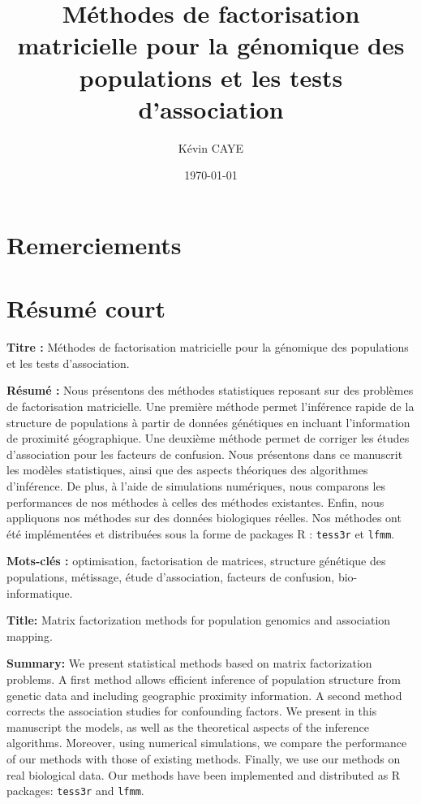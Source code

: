 \documentclass[12pt,a4paper,twoside]{ugathesis}
\author{Kévin CAYE}
\date{\today}
\title{Méthodes de factorisation matricielle pour la génomique des populations et les tests d'association}
\begin{document}
\maketitle
\tableofcontents

\baselineskip 0.7cm
\frontmatter

\chapter{Remerciements}
\label{sec:org8effc96}
\chapter{Résumé court}
\label{sec:org71b884f}

\noindent \textbf{Titre :} Méthodes de factorisation matricielle pour la génomique des
populations et les tests d'association.

\noindent \textbf{Résumé :} Nous présentons des méthodes statistiques reposant sur des
problèmes de factorisation matricielle. Une première méthode permet l'inférence
rapide de la structure de populations à partir de données génétiques en incluant
l'information de proximité géographique. Une deuxième méthode permet de corriger
les études d'association pour les facteurs de confusion. Nous présentons dans ce
manuscrit les modèles statistiques, ainsi que des aspects théoriques des
algorithmes d'inférence. De plus, à l'aide de simulations numériques, nous
comparons les performances de nos méthodes à celles des méthodes existantes.
Enfin, nous appliquons nos méthodes sur des données biologiques réelles. Nos
méthodes ont été implémentées et distribuées sous la forme de packages R :
\texttt{tess3r} et \texttt{lfmm}.

\noindent \textbf{Mots-clés :} optimisation, factorisation de matrices, structure génétique des
populations, métissage, étude d'association, facteurs de confusion, bio-informatique.

\vspace{0.5cm}

\noindent \textbf{Title:} Matrix factorization methods for population genomics and association
mapping.

\noindent \textbf{Summary:} We present statistical methods based on matrix
factorization problems. A first method allows efficient inference of population
structure from genetic data and including geographic proximity information. A
second method corrects the association studies for confounding factors. We
present in this manuscript the models, as well as the theoretical aspects of the
inference algorithms. Moreover, using numerical simulations, we compare the
performance of our methods with those of existing methods. Finally, we use our
methods on real biological data. Our methods have been implemented and
distributed as R packages: \texttt{tess3r} and \texttt{lfmm}.
\end{document}
